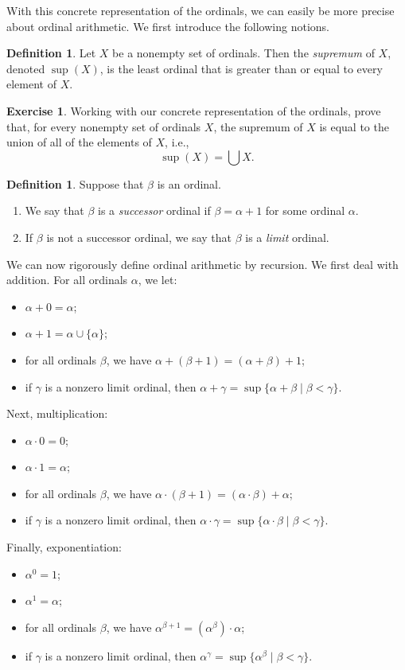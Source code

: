 \documentclass[a4paper]{memoir}
\theoremstyle{definition}
\newtheorem{definition}[theorem]{Definition}
\newtheorem{exercise}[theorem]{Exercise}
\begin{document}
With this concrete representation of the ordinals, we can easily be more precise about 
ordinal arithmetic. We first introduce the following notions.

\begin{definition}
  Let $X$ be a nonempty set of ordinals. Then the \emph{supremum} of $X$, denoted 
  $\sup(X)$, is the least ordinal that is greater than or equal to every element of $X$.
\end{definition}

\begin{exercise}
  Working with our concrete representation of the ordinals, prove that, for every nonempty 
  set of ordinals $X$, the supremum of $X$ is equal to the union of all of the elements of 
  $X$, i.e., 
  \[
    \sup(X) = \bigcup X.
  \]
\end{exercise}

\begin{definition}
  Suppose that $\beta$ is an ordinal.
  \begin{enumerate}
    \item We say that $\beta$ is a \emph{successor} ordinal if $\beta = \alpha + 1$ for some 
    ordinal $\alpha$.
    \item If $\beta$ is not a successor ordinal, we say that $\beta$ is a \emph{limit} 
    ordinal.
  \end{enumerate}
\end{definition}

We can now rigorously define ordinal arithmetic by recursion. We first deal with addition. 
For all ordinals $\alpha$, we let:
\begin{itemize}
  \item $\alpha + 0 = \alpha$;
  \item $\alpha + 1 = \alpha \cup \{\alpha\}$;
  \item for all ordinals $\beta$, we have $\alpha + (\beta + 1) = (\alpha + \beta) + 1$;
  \item if $\gamma$ is a nonzero limit ordinal, then 
  $\alpha + \gamma = \sup\{\alpha + \beta \mid \beta < \gamma\}$.
\end{itemize}
Next, multiplication:
\begin{itemize}
  \item $\alpha \cdot 0 = 0$;
  \item $\alpha \cdot 1 = \alpha$;
  \item for all ordinals $\beta$, we have $ \alpha \cdot (\beta + 1) = (\alpha \cdot \beta) + \alpha$;
  \item if $\gamma$ is a nonzero limit ordinal, then 
  $\alpha \cdot \gamma = \sup\{\alpha \cdot \beta \mid \beta < \gamma\}$.
\end{itemize}
Finally, exponentiation:
\begin{itemize}
  \item $\alpha^0 = 1$;
  \item $\alpha^1 = \alpha$;
  \item for all ordinals $\beta$, we have $\alpha^{\beta + 1} = (\alpha^\beta) \cdot \alpha$;
  \item if $\gamma$ is a nonzero limit ordinal, then
  $\alpha^\gamma = \sup\{\alpha^\beta \mid \beta < \gamma\}$.
\end{itemize}
\end{document}

